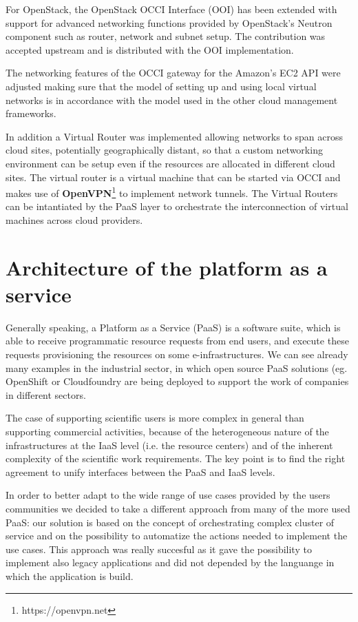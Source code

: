 \documentclass{article}
\begin{document}
For OpenStack, the OpenStack OCCI Interface (OOI) has been extended with support for advanced networking functions provided by OpenStack’s Neutron component such as router, network and subnet setup. The contribution was accepted upstream and is distributed with the OOI implementation.

The networking features of the OCCI gateway for the Amazon’s EC2 API were adjusted making sure that the model of setting up and using local virtual networks is in accordance with the model used in the other cloud management frameworks.

In addition a Virtual Router was implemented allowing networks to span across cloud  sites,  potentially geographically  distant,  so  that  a custom  networking  environment  can  be  setup  even if the resources are allocated in different cloud sites. The virtual router is a virtual machine that can be started via OCCI and makes use of {\bf OpenVPN}\footnote{https://openvpn.net} to implement network tunnels. The Virtual Routers can be intantiated by the PaaS layer to orchestrate the interconnection of virtual machines across cloud providers.





\section{Architecture of the platform as a service}
\label{sec:paas}

Generally speaking, a Platform as a Service (PaaS) is a software suite, which is able to receive programmatic resource requests from end users, and execute these requests provisioning the resources on some e-infrastructures. We can see already many examples in the industrial sector, in which open source PaaS solutions (eg. OpenShift\cite{OPENSHIFT} or Cloudfoundry are being deployed to support the work of companies in different sectors.

The case of supporting scientific users is more complex in general than supporting commercial activities, because of the heterogeneous nature of the infrastructures at the IaaS level (i.e. the resource centers) and of the inherent complexity of the scientific work requirements. The key point is to find the right agreement to unify interfaces between the PaaS and IaaS levels.

In order to better adapt to the wide range of use cases provided by the users communities we decided to take a different approach from many of the more used PaaS: our solution is based on the concept of orchestrating complex cluster of service and on the possibility to automatize the actions needed to implement the use cases. 
This approach was really succesful as it gave the possibility to implement also legacy applications and did not depended by the languange in which the application is build. 
 
\end{document}
